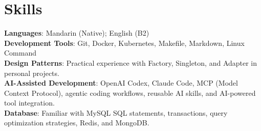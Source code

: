 \documentclass[letterpaper,10pt]{article}
\begin{document}
\section{Skills}
 \begin{itemize}[leftmargin=0.15in, label={}]
    \small{\item{
     \textbf{Languages}{: Mandarin (Native); English (B2)} \\
     \textbf{Development Tools}{: Git, Docker, Kubernetes, Makefile, Markdown, Linux Command} \\
     \textbf{Design Patterns}{: Practical experience with Factory, Singleton, and Adapter in personal projects.} \\
     \textbf{AI-Assisted Development}{: OpenAI Codex, Claude Code, MCP (Model Context Protocol), agentic coding workflows, reusable AI skills, and AI-powered tool integration.} \\
     \textbf{Database}{: Familiar with MySQL SQL statements, transactions, query optimization strategies, Redis, and MongoDB.}
    }}
 \end{itemize}


\end{document}
